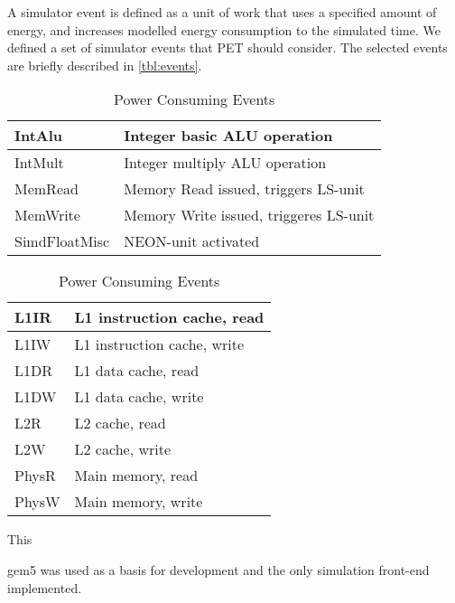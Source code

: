 A simulator event is defined as a unit of work that uses a specified amount of
energy, and increases modelled energy consumption to the simulated time. We
defined a set of simulator events that PET should consider. The selected events
are briefly described in \autoref{tbl:events}.

\begin{table}[ht]
    \centering
    \begin{minipage}[b]{\linewidth}
        \centering
        \begin{tabular}{|l|l|}
            \hline
            IntAlu    & Integer basic ALU operation\\
            \hline
            IntMult    & Integer multiply ALU operation \\
            \hline
            MemRead    & Memory Read issued, triggers LS-unit \\
            \hline
            MemWrite    & Memory Write issued, triggeres LS-unit \\
            \hline
            SimdFloatMisc     & NEON-unit activated \\
            \hline
        \end{tabular}
    \end{minipage}

    \begin{minipage}[b]{\linewidth}
        \centering
        \begin{tabular}{|l|l|}
            \hline
            L1IR    & L1 instruction cache, read \\
            \hline
            L1IW    & L1 instruction cache, write \\
            \hline
            L1DR    & L1 data cache, read \\
            \hline
            L1DW    & L1 data cache, write \\
            \hline
            L2R     & L2 cache, read \\
            \hline
            L2W     & L2 cache, write \\
            \hline
            PhysR   & Main memory, read \\
            \hline
            PhysW   & Main memory, write \\
            \hline
        \end{tabular}
    \end{minipage}
    \caption{Power Consuming Events}
    \label{tbl:events}
\end{table}

This 

gem5 was used as a basis for development and the only simulation front-end
implemented.
